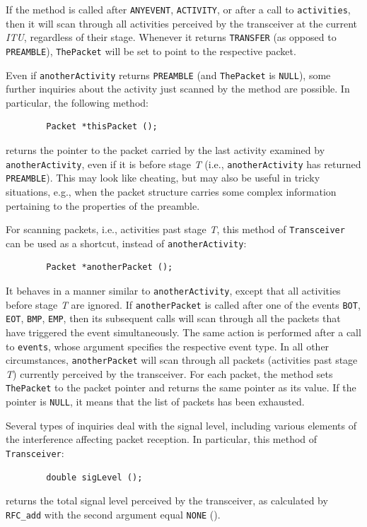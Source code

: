 If the method is called after {\tt ANYEVENT}, {\tt ACTIVITY}, or after
a call to {\tt activities}, then it will scan through
all activities perceived by the transceiver at the current {\em ITU},
regardless of their stage.
Whenever it returns {\tt TRANSFER} (as opposed to {\tt PREAMBLE}),
{\tt ThePacket} will be set to point to the respective packet.

Even if {\tt anotherActivity} returns {\tt PREAMBLE} (and
{\tt ThePacket} is {\tt NULL}),
some further inquiries about the activity just scanned by the
method are possible.
In particular, the following method:
\begin{verbatim}
        Packet *thisPacket ();
\end{verbatim}
\noindent
returns the pointer to the packet carried by the last activity examined
by {\tt anotherActivity}, even if it is before stage {\em T\/} (i.e.,
{\tt anotherActivity} has returned {\tt PREAMBLE}).
This may look like cheating, but may also be useful in tricky situations,
e.g., when the
packet structure carries some complex information pertaining to the properties
of the preamble.

For scanning packets, i.e., activities past stage {\em T}, this method of
{\tt Transceiver} can be
used as a shortcut, instead of {\tt anotherActivity}:
\begin{verbatim}
        Packet *anotherPacket ();
\end{verbatim}
It behaves in a manner similar to {\tt anotherActivity}, except that all
activities before stage {\em T\/} are ignored.
If {\tt anotherPacket} is called after one of the events
{\tt BOT}, {\tt EOT}, {\tt BMP}, {\tt EMP},
then its subsequent calls will scan through all the packets that have
triggered the event simultaneously.
The same action is performed after a call to {\tt events}, whose argument
specifies the respective event type.
In all other circumstances, {\tt anotherPacket} will scan through all packets
(activities past stage {\em T\/}) currently perceived by the
transceiver.
For each packet, the method sets {\tt ThePacket} to the packet pointer and
returns the same pointer as its value.
If the pointer is {\tt NULL}, it means that the list of
packets has been exhausted.

Several types of inquiries deal with the signal level, including various
elements of the interference affecting packet reception.
In particular, this method of {\tt Transceiver}:
\begin{verbatim}
        double sigLevel ();
\end{verbatim}
\noindent
returns the total signal level perceived by the transceiver, as calculated
by {\tt RFC\_add} with the second argument equal {\tt NONE}
().

